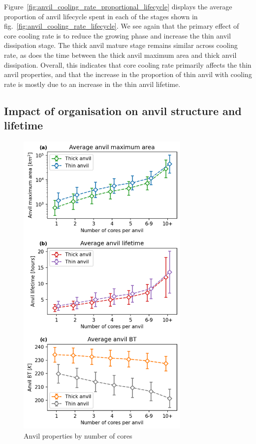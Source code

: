 Figure~\ref{fig:anvil_cooling_rate_proportional_lifecycle} displays the average proportion of anvil lifecycle spent in each of the stages shown in fig.~\ref{fig:anvil_cooling_rate_lifecycle}.
We see again that the primary effect of core cooling rate is to reduce the growing phase and increase the thin anvil dissipation stage.
The thick anvil mature stage remains similar across cooling rate, as does the time between the thick anvil maximum area and thick anvil dissipation.
Overall, this indicates that core cooling rate primarily affects the thin anvil properties, and that the increase in the proportion of thin anvil with cooling rate  is mostly due to an increase in the thin anvil lifetime.

\subsection{Impact of organisation on anvil structure and lifetime}

\begin{figure}[tp]
    \centering
    \includegraphics[width=0.75\textwidth]{figures/ch2_24.png}
    \caption{Anvil properties by number of cores}
    \label{fig:anvil_number_of_cores_properties}
\end{figure}


